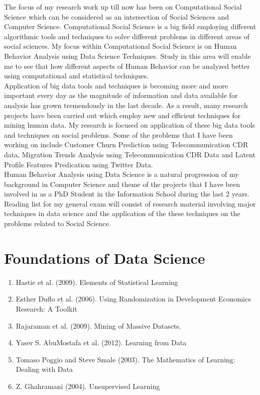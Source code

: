 
The focus of my research work up till now has been on Computational Social Science which can be considered as an intersection of Social Sciences and Computer Science. Computational Social Science is a big field employing different algorithmic tools and techniques to solve different problems in different areas of social sciences. My focus within Computational Social Science is on Human Behavior Analysis using Data Science Techniques. Study in this area will enable me to see that how different aspects of Human Behavior can be analyzed better using computational and statistical techniques.\\ 
Application of big data tools and techniques is becoming more and more important every day as the magnitude of information and data available for analysis has grown tremendously in the last decade. As a result, many research projects have been carried out which employ new and efficient techniques for mining human data. My research is focused on application of these big data tools and techniques on social problems. Some of the problems that I have been working on include Customer Churn Prediction using Telecommunication CDR data, Migration Trends Analysis using Telecommunication CDR Data and Latent Profile Features Predication using Twitter Data.\\ 

Human Behavior Analysis using Data Science is a natural progression of my background in Computer Science and theme of the projects that I have been involved in as a PhD Student in the Information School during the last 2 years.   Reading list for my general exam will consist of research material involving major techniques in data science and the application of the these techniques on the problems related to Social Science. 
\\

\section{Foundations of Data Science}
\begin{enumerate}   
\item  Hastie et al. (2009). Elements of Statistical Learning \cite{StatisticalLearning_2009}  
\item  Esther Duflo et al. (2006). Using Randomization in Development Economics Research: A Toolkit \cite{Duflo}   
\item  Rajaraman et al. (2009). Mining of Massive Datasets. \cite{Rajaraman_2009}  
\item  Yaser S. AbuMostafa et al. (2012). Learning from Data \cite{Abu-Mostafa:2012:LD:2207825}  
\item  Tomaso Poggio and Steve Smale (2003).  The Mathematics of Learning: Dealing with Data\cite{Poggio_2005} 
\item  Z. Ghahramani (2004).  Unsupervised Learning \cite{Ghahramani_2004}

\end{enumerate}  
\\

